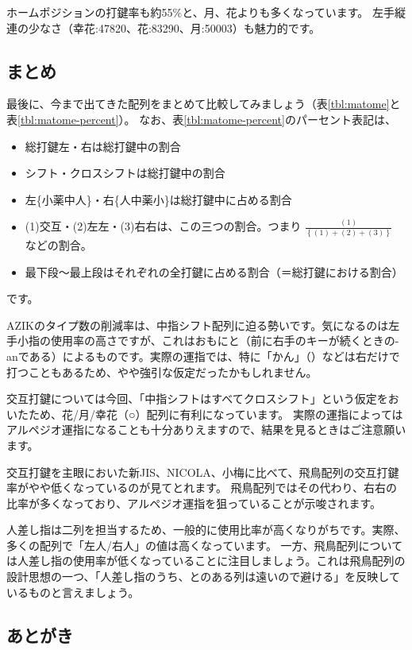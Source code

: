 ホームポジションの打鍵率も約55\%と、月、花よりも多くなっています。
左手縦連の少なさ（幸花:47820、花:83290、月:50003）も魅力的です。

\subsection{まとめ}

最後に、今まで出てきた配列をまとめて比較してみましょう（表\ref{tbl:matome}と表\ref{tbl:matome-percent}）。
なお、表\ref{tbl:matome-percent}のパーセント表記は、
\begin{itemize}
 \item 総打鍵左・右は総打鍵中の割合
 \item シフト・クロスシフトは総打鍵中の割合
 \item 左\{小薬中人\}・右\{人中薬小\}は総打鍵中に占める割合
 \item (1)交互・(2)左左・(3)右右は、この三つの割合。つまり $ \frac{(1)}{\left\{(1)+(2)+(3)\right\}} $ などの割合。
 \item 最下段～最上段はそれぞれの全打鍵に占める割合（＝総打鍵における割合）
\end{itemize}
です。

AZIKのタイプ数の削減率は、中指シフト配列に迫る勢いです。気になるのは左手小指の使用率の高さですが、これはおもにと（前に右手のキーが続くときの-anである）によるものです。実際の運指では、特に「かん」（）などは右だけで打つこともあるため、やや強引な仮定だったかもしれません。

交互打鍵については今回、「中指シフトはすべてクロスシフト」という仮定をおいたため、花/月/幸花（○）配列に有利になっています。
実際の運指によってはアルペジオ運指になることも十分ありえますので、結果を見るときはご注意願います。

交互打鍵を主眼においた新JIS、NICOLA、小梅に比べて、飛鳥配列の交互打鍵率がやや低くなっているのが見てとれます。
飛鳥配列ではその代わり、右右の比率が多くなっており、アルペジオ運指を狙っていることが示唆されます。%

人差し指は二列を担当するため、一般的に使用比率が高くなりがちです。実際、多くの配列で「左人/右人」の値は高くなっています。
一方、飛鳥配列については人差し指の使用率が低くなっていることに注目しましょう。これは飛鳥配列の設計思想の一つ、「人差し指のうち、とのある列は遠いので避ける」を反映しているものと言えましょう。

\subsection{あとがき}

